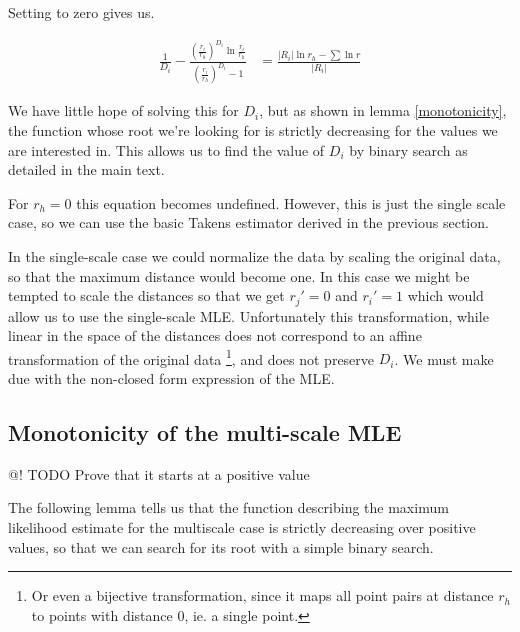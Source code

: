 \documentclass[11pt]{article}
\begin{document}
Setting to zero gives us.

\begin{align*}
\frac{1}{D_i}  - \frac{\left(\frac{r_i}{r_h}\right)^{D_i} \ln \frac{r_i}{r_h}}{\left(\frac{r_i}{r_h}\right)^{D_i} -1} &= \frac{|R_i| \ln r_h - \sum \ln r}{|R_i|}  
\end{align*}

We have little hope of solving this for $D_i$, but as shown in lemma \ref{monotonicity}, the function whose root we're looking for is strictly decreasing for the values we are interested in. This allows us to find the value of $D_i$ by binary search as detailed in the main text.

For $r_h = 0$ this equation becomes undefined. However, this is just the single scale case, so we can use the basic Takens estimator derived in the previous section.

In the single-scale case we could normalize the data by scaling the original data, so that the maximum distance would become one. In this case we might be tempted to scale the distances so that we get $r_j' = 0$ and $r_i' = 1$ which would allow us to use the single-scale MLE. Unfortunately this transformation, while linear in the space of the distances does not correspond to an affine transformation of the original data \footnote{Or even a bijective transformation, since it maps all point pairs at distance $r_h$ to points with distance $0$, ie. a single point.}, and does not preserve $D_i$. We must make due with the non-closed form expression of the MLE.

\subsection{Monotonicity of the multi-scale MLE}

@! TODO Prove that it starts at a positive value

The following lemma tells us that the function describing the maximum likelihood estimate for the multiscale case is strictly decreasing over positive values, so that we can search for its root with a simple binary search.
\end{document}
